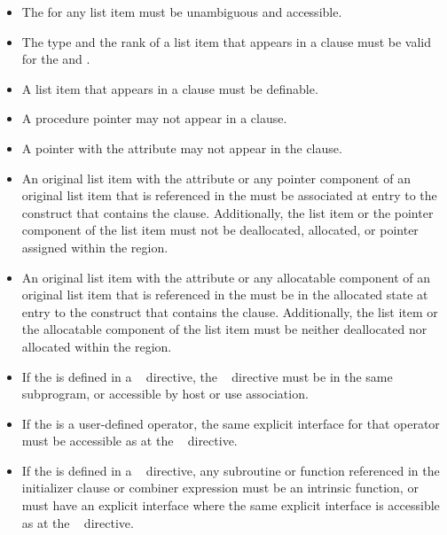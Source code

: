 {{{{\begin{itemize}
\item The  for any list item must be unambiguous and accessible.
\ccppspecificend
\bigskip

\fortranspecificstart
\item The type and the rank of a list item that appears in a  clause must be valid for the  and .

\item A list item that appears in a  clause must be definable.

\item A procedure pointer may not appear in a  clause.

\item A pointer with the  attribute may not appear in the  
clause. 

\item An original list item with the  attribute or any
  pointer component of an original list item that is referenced in the
   must be associated at entry to the construct that
  contains the  clause. Additionally, the list item or
  the pointer component of the list item must not be deallocated,
  allocated, or pointer assigned within the region.

\item An original list item with the  attribute or
  any allocatable component of an original list item that is
  referenced in the  must be in the allocated state at entry
  to the construct that contains the 
  clause. Additionally, the list item or the allocatable component of
  the list item must be neither deallocated nor allocated within the
  region.

\item If the  is defined in a ~ directive, the 
~ directive must be in the same subprogram, or accessible by 
host or use association.

\item If the  is a user-defined operator, the same explicit interface for 
that operator must be accessible as at the ~ directive.

\item If the  is defined in a ~ directive, any 
subroutine or function referenced in the initializer clause or combiner expression 
must be an intrinsic function, or must have an explicit interface where the same 
explicit interface is accessible as at the ~ directive.
\fortranspecificend
\end{itemize}










}}}}
